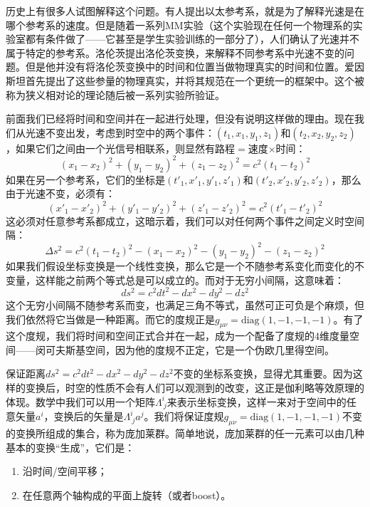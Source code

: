\documentclass{ctexart}
\begin{document}
历史上有很多人试图解释这个问题。有人提出以太参考系，就是为了解释光速是在哪个参考系的速度。但是随着一系列MM实验（这个实验现在任何一个物理系的实验室都有条件做了——它甚至是学生实验训练的一部分了），人们确认了光速并不属于特定的参考系。洛伦茨提出洛伦茨变换，来解释不同参考系中光速不变的问题。但是他并没有将洛伦茨变换中的时间和位置当做物理真实的时间和位置。爱因斯坦首先提出了这些参量的物理真实，并将其规范在一个更统一的框架中。这个被称为狭义相对论的理论随后被一系列实验所验证。

前面我们已经将时间和空间并在一起进行处理，但没有说明这样做的理由。现在我们从光速不变出发，考虑到时空中的两个事件：$(t_1,x_1,y_1,z_1)$和$(t_2,x_2,y_2,z_2)$，如果它们之间由一个光信号相联系，则显然有路程$=$速度$\times$时间：
\begin{equation}
(x_1-x_2)^2+(y_1-y_2)^2+(z_1-z_2)^2=c^2(t_1-t_2)^2
\end{equation}
如果在另一个参考系，它们的坐标是$(t'_1,x'_1,y'_1,z'_1)$和$(t'_2,x'_2,y'_2,z'_2)$，那么由于光速不变，必须有：
\begin{equation}
(x'_1-x'_2)^2+(y'_1-y'_2)^2+(z'_1-z'_2)^2=c^2(t'_1-t'_2)^2
\end{equation}
这必须对任意参考系都成立，这暗示着，我们可以对任何两个事件之间定义时空间隔：
\begin{equation}
\Delta s^2=c^2(t_1-t_2)^2-(x_1-x_2)^2-(y_1-y_2)^2-(z_1-z_2)^2
\end{equation}
如果我们假设坐标变换是一个线性变换，那么它是一个不随参考系变化而变化的不变量，这样能之前两个等式总是可以成立的。而对于无穷小间隔，这意味着：
\begin{equation}
ds^2=c^2dt^2-dx^2-dy^2-dz^2
\end{equation}
这个无穷小间隔不随参考系而变，也满足三角不等式，虽然可正可负是个麻烦，但我们依然将它当做是一种距离。而它的度规正是$g_{\mu\nu}=\mathrm{diag}(1,-1,-1,-1)$。有了这个度规，我们将时间和空间正式合并在一起，成为一个配备了度规的4维度量空间——闵可夫斯基空间，因为他的度规不正定，它是一个伪欧几里得空间。

保证距离$ds^2=c^2dt^2-dx^2-dy^2-dz^2$不变的坐标系变换，显得尤其重要。因为这样的变换后，时空的性质不会有人们可以观测到的改变，这正是伽利略等效原理的体现。数学中我们可以用一个矩阵$\Lambda_{\ j}^i$来表示坐标变换，这样一来对于空间中的任意矢量$a^i$，变换后的矢量是$\Lambda^i_{\ j}a^j$。我们将保证度规$g_{\mu\nu}=\mathrm{diag}(1,-1,-1,-1)$不变的变换所组成的集合，称为庞加莱群。简单地说，庞加莱群的任一元素可以由几种基本的变换“生成”，它们是：
\begin{enumerate}
\item 沿时间/空间平移；
\item 在任意两个轴构成的平面上旋转（或者boost）。
\end{enumerate}
\end{document}

